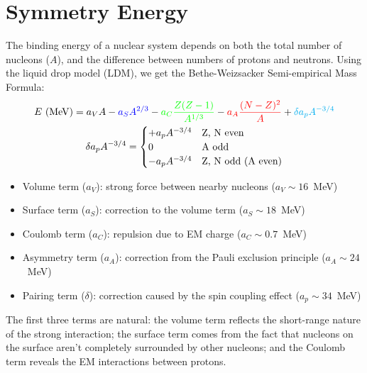 \section{Symmetry Energy} 
The binding energy of a nuclear system depends on both the total number of nucleons ($A$),
and the difference between numbers of protons and neutrons.
Using the liquid drop model (LDM), we get the Bethe-Weizsacker Semi-empirical Mass Formula:
\begin{equation}
    \begin{gathered}
	E\ (\mathrm{MeV}) = \textcolor{black}{a_V A} 
	    - \textcolor{blue}{a_S A^{2/3}} 
	    - \textcolor{green}{a_C\frac{Z(Z-1)}{A^{1/3}}} 
	    - \textcolor{red}{a_A\frac{(N-Z)^2}{A}} 
	    + \textcolor{cyan}{\delta a_p A^{-3/4}} \\
	\delta a_p A^{-3/4} = 
	    \begin{cases}
		+a_p A^{-3/4}	& \text{Z, N even} \\
		0		& \text{A odd}	\\
		-a_p A^{-3/4}	& \text{Z, N odd (A even)} \\
	    \end{cases}
    \end{gathered}
    \label{eq:mass-formula}
\end{equation}

\begin{itemize}
    \color{black} \item Volume term ($a_V$): strong force between nearby nucleons ($a_V \sim 16$~MeV)
    \color{blue}  \item Surface term ($a_S$): correction to the volume term ($a_S \sim 18$~MeV)
    \color{green} \item Coulomb term ($a_C$): repulsion due to EM charge ($a_C \sim 0.7$~MeV)
    \color{red}   \item Asymmetry term ($a_A$): correction from the Pauli exclusion principle ($a_A \sim 24$~MeV)
    \color{cyan}  \item Pairing term ($\delta$): correction caused by the spin coupling effect 
	($a_p \sim 34$~MeV)
\end{itemize}

The first three terms are natural:
the volume term reflects the short-range nature of the strong interaction; the
surface term comes from the fact that nucleons on the surface aren't completely 
surrounded by other nucleons; and the Coulomb term reveals the EM interactions between
protons. 

